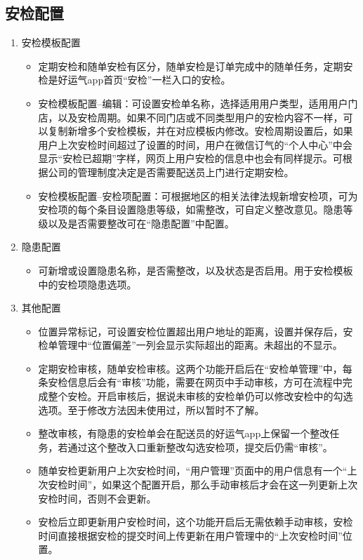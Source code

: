 \documentclass[UTF8]{ctexart}
\begin{document}
\subsection{安检配置}
\begin{enumerate}
	\item 安检模板配置
	
	\begin{itemize}
		

	\item 定期安检和随单安检有区分，随单安检是订单完成中的随单任务，定期安检是好运气app首页“安检”一栏入口的安检。
	
	\item 安检模板配置--编辑：可设置安检单名称，选择适用用户类型，适用用户门店，以及安检周期。如果不同门店或不同类型用户的安检内容不一样，可以复制新增多个安检模板，并在对应模板内修改。安检周期设置后，如果用户上次安检时间超过了设置的时间，用户在微信订气的“个人中心”中会显示“安检已超期”字样，网页上用户安检的信息中也会有同样提示。可根据公司的管理制度决定是否需要配送员上门进行定期安检。
	
    \item 安检模板配置--安检项配置：可根据地区的相关法律法规新增安检项，可为安检项的每个条目设置隐患等级，如需整改，可自定义整改意见。隐患等级以及是否需要整改可在“隐患配置”中配置。
	
	\end{itemize}
	
	\item 隐患配置
	\begin{itemize}
		\item 
	
	可新增或设置隐患名称，是否需整改，以及状态是否启用。用于安检模板中的安检项隐患选项。
	\end{itemize}
	\item 其他配置
	
	\begin{itemize} 
	
	\item 位置异常标记，可设置安检位置超出用户地址的距离，设置并保存后，安检单管理中“位置偏差”一列会显示实际超出的距离。未超出的不显示。
	
	\item 定期安检审核，随单安检审核。这两个功能开启后在“安检单管理”中，每条安检信息后会有“审核”功能，需要在网页中手动审核，方可在流程中完成整个安检。开启审核后，据说未审核的安检单仍可以修改安检中的勾选选项。至于修改方法因未使用过，所以暂时不了解。
	
	\item 整改审核，有隐患的安检单会在配送员的好运气app上保留一个整改任务，若通过这个整改入口重新整改勾选安检项，提交后仍需“审核”。
	
	\item 随单安检更新用户上次安检时间，“用户管理”页面中的用户信息有一个“上次安检时间”，如果这个配置开启，那么手动审核后才会在这一列更新上次安检时间，否则不会更新。
	
	\item 安检后立即更新用户安检时间，这个功能开启后无需依赖手动审核，安检时间直接根据安检的提交时间上传更新在用户管理中的“上次安检时间”位置。
	\end{itemize}

\end{enumerate}
\end{document}
